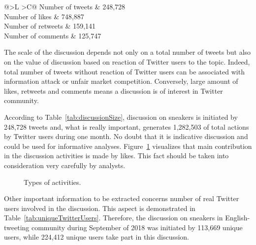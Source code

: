 \begin{table} [htbp]%
	\centering
	\caption{Size of the discussion.}%
	\label{tab:discussionSize}%
	\renewcommand{\arraystretch}{1.6}%
		\begin{tabulary}{\textwidth}{@{}>{\zz}L >{\zz}C@{}}%
			\toprule     %
			Number of tweets & 248,728 \\ 
			Number of likes & 748,887  \\
			Number of retweets & 159,141 \\ 
			Number of comments & 125,747 \\ 
			\bottomrule %
		\end{tabulary}%
\end{table}

The scale of the discussion depends not only on a total number of tweets but also on the value of discussion based on reaction of Twitter users to the topic. Indeed, total number of tweets without reaction of Twitter users can be associated with information attack or unfair market competition. Conversely, large amount of likes, retweets and comments means a discussion is of interest in Twitter community.

According to Table~\cref{tab:discussionSize}, discussion on sneakers is initiated by 248,728 tweets and, what is really important, generates 1,282,503 of total actions by Twitter users during one month. No doubt that it is indicative discussion and could be used for informative analyses. Figure~\cref{fig:activityTypes} visualizes that main contribution in the discussion activities is made by likes. This fact should be taken into consideration very carefully by analysts.

\begin{figure}[ht]
	\caption{Types of activities.}\label{fig:activityTypes}
\end{figure}

Other important information to be extracted concerns number of real Twitter users involved in the discussion. This aspect is demonstrated in Table~\cref{tab:uniqueTwitterUsers}. Therefore, the discussion on sneakers in English-tweeting community during September of 2018 was initiated by 113,669 unique users, while 224,412 unique users take part in this discussion.

